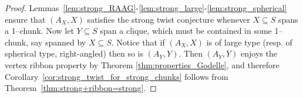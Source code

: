 \documentclass[svgnames]{amsart}
\theoremstyle{plain}
\theoremstyle{definition}
\begin{document}
\begin{proof} Lemmas~\ref{lem:strong_RAAG}-\ref{lem:strong_large}-\ref{lem:strong_spherical} ensure that $(A_X,X)$ satisfies the strong twist conjecture whenever $X\subseteq S$ spans a 1--chunk. Now let $Y\subseteq S$ span a clique, which must be contained in some 1--chunk, say spanned by $X\subseteq S$. Notice that if $(A_X,X)$ is of large type (resp. of spherical type, right-angled) then so is $(A_Y,Y)$. Then $(A_Y,Y)$ enjoys the vertex ribbon property by Theorem \ref{thm:properties_Godelle}, and therefore Corollary~\ref{cor:strong_twist_for_strong_chunks} follows from Theorem~\ref{thm:strong+ribbon=strong}.
\end{proof}



\end{document}
